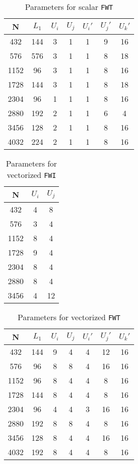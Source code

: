 \begin{table}[h]
\centering
\begin{tabular}{|c|c|c|c|c|c|c|}
\hline
N & $L_1$ & $U_i$ & $U_j$ & $U_i'$ & $U_j'$ & $U_k'$ \\
\hline
432 & 144 & 3 & 1 & 1 & 9 & 16\\
576 & 576 & 3 & 1 & 1 & 8 & 18\\
1152 & 96 & 3 & 1 & 1 & 8 & 16\\
1728 & 144 & 3 & 1 & 1 & 8 & 18\\
2304 & 96 & 1 & 1 & 1 & 8 & 16\\
2880 & 192 & 2 & 1 & 1 & 6 & 4\\
3456 & 128 & 2 & 1 & 1 & 8 & 16\\
4032 & 224 & 2 & 1 & 1 & 8 & 16\\
\hline
\end{tabular}
\caption{Parameters for scalar \texttt{FWT}}
\end{table}

\begin{table}[h]
\centering
\begin{tabular}{|c|c|c|}
\hline
N & $U_i$ & $U_j$ \\
\hline
432 & 4 & 8\\
576 & 3 & 4\\
1152 & 8 & 4\\
1728 & 9 & 4\\
2304 & 8 & 4\\
2880 & 8 & 4\\
3456 & 4 & 12\\
\hline
\end{tabular}
\caption{Parameters for vectorized \texttt{FWI}}
\end{table}

\begin{table}[h]
\centering
\begin{tabular}{|c|c|c|c|c|c|c|}
\hline
N & $L_1$ & $U_i$ & $U_j$ & $U_i'$ & $U_j'$ & $U_k'$ \\
\hline
432 & 144 & 9 & 4 & 4 & 12 & 16\\
576 & 96 & 8 & 8 & 4 & 16 & 16\\
1152 & 96 & 8 & 4 & 4 & 8 & 16\\
1728 & 144 & 8 & 4 & 4 & 8 & 16\\
2304 & 96 & 4 & 4 & 3 & 16 & 16\\
2880 & 192 & 8 & 8 & 4 & 8 & 16\\
3456 & 128 & 8 & 4 & 4 & 16 & 16\\
4032 & 192 & 8 & 4 & 4 & 8 & 16\\
\hline
\end{tabular}
\caption{Parameters for vectorized \texttt{FWT}}
\end{table}